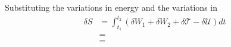 Substituting the variations in energy and the variations in 
\begin{equation}\label{eq:Sfinal}
\begin{aligned}
\delta S &= \int_{t_1}^{t_2}(\delta W_1+\delta W_2+\delta\mathcal{T}-\delta\mathcal{U})dt\\
&=\\
&=
\end{aligned}
\end{equation}





